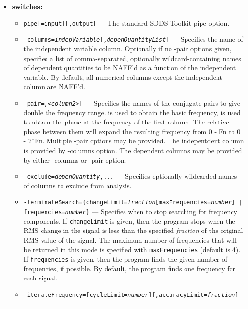 \begin{itemize}
{\em outputFile} contains two columns for each selected column in {\em
inputFile}.  These columns have names like {\em origColumn}{\tt
Frequency} and {\em origColumn}{\tt Amplitude}, giving the frequency
and amplitude for {\em origColumn}.

\item {\bf switches:}
    \begin{itemize}
    \item \verb|pipe[=input][,output]| --- The standard SDDS Toolkit pipe option.
    \item {\tt -columns={\em indepVariable}[,{\em depenQuantityList}]} --- Specifies the name of the
        independent variable column.  Optionally if no -pair options given, specifies a list of comma-separated, optionally
        wildcard-containing names of dependent quantities to be NAFF'd as a function of the 
        independent variable. 
        By default, all numerical columns except the independent column are NAFF'd.
     \item {\tt -pair={\em <column1>,<column2>}]} --- Specifies the names of the conjugate pairs to
        give double the frequency range. {\em<column1>} is used to obtain the basic frequency, 
        {\em<column2>} is used to obtain the phase at the frequency of the first column. 
        The relative phase between them will expand the resulting frequency from 0 - Fn to 0 - 2*Fn.
        Multiple -pair options may be provided. The indepentdent 
        column is provided by -columns option. The dependent columns may be provided by either -columns
        or -pair option. 
    \item {\tt -exclude={\em depenQuantity},...} --- Specifies optionally wildcarded names of columns
        to exclude from analysis.
    \item {\tt -terminateSearch=\{changeLimit={\em fraction}[maxFrequencies={\em number}] | }
        {\tt frequencies={\em number}\}} --- Specifies when to stop searching for frequency 
        components.  If {\tt changeLimit} is given, then the program stops when the RMS change
        in the signal is less than the specified {\em fraction} of the original RMS value of
        the signal.  The maximum number of frequencies that will be returned in this mode
        is specified with {\tt maxFrequencies} (default is 4).  If {\tt frequencies} is given,
        then the program finds the given number of frequencies, if possible.
        By default, the program finds one frequency for each signal.
    \item {\tt -iterateFrequency=[cycleLimit={\em number}][,accuracyLimit={\em fraction}]} ---

\end{itemize}
\end{itemize}
